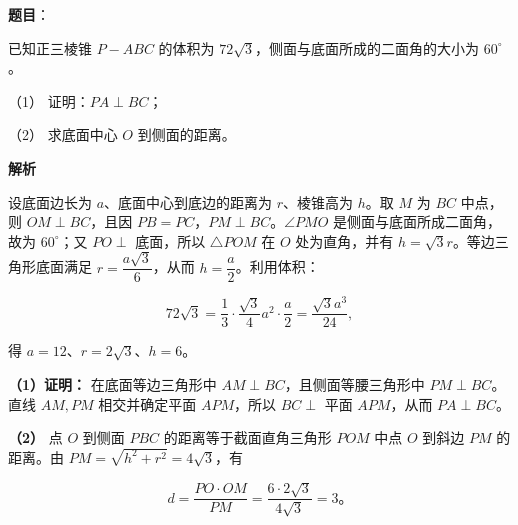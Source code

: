 \begin{answer}

\textbf{题目}：

已知正三棱锥 $P-ABC$ 的体积为 $72\sqrt3$，侧面与底面所成的二面角的大小为 $60^\circ$。

（1） 证明：$PA\perp BC$；

（2） 求底面中心 $O$ 到侧面的距离。
\nopagebreak[4]
\begin{center}\end{center}
\nopagebreak[4]
\textbf{解析}

设底面边长为 $a$、底面中心到底边的距离为 $r$、棱锥高为 $h$。取 $M$ 为 $BC$ 中点，则 $OM\perp BC$，且因 $PB=PC$，$PM\perp BC$。$\angle PMO$ 是侧面与底面所成二面角，故为 $60^\circ$；又 $PO\perp$ 底面，所以 $\triangle POM$ 在 $O$ 处为直角，并有 $h=\sqrt3r$。等边三角形底面满足 $r=\dfrac{a\sqrt3}{6}$，从而 $h=\dfrac a2$。利用体积：

\nopagebreak[4]
\[
72\sqrt3=\frac13\cdot\frac{\sqrt3}{4}a^2\cdot\frac a2
=\frac{\sqrt3a^3}{24},
\]

得 $a=12$、$r=2\sqrt3$、$h=6$。

\textbf{（1）证明：} 在底面等边三角形中 $AM\perp BC$，且侧面等腰三角形中 $PM\perp BC$。直线 $AM,PM$ 相交并确定平面 $APM$，所以 $BC\perp$ 平面 $APM$，从而 $PA\perp BC$。

\textbf{（2）} 点 $O$ 到侧面 $PBC$ 的距离等于截面直角三角形 $POM$ 中点 $O$ 到斜边 $PM$ 的距离。由 $PM=\sqrt{h^2+r^2}=4\sqrt3$，有

\nopagebreak[4]
\[
d=\frac{PO\cdot OM}{PM}=\frac{6\cdot2\sqrt3}{4\sqrt3}=3\text{。}
\]



\end{answer}
